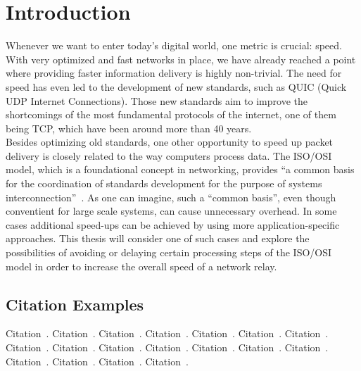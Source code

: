 
\chapter{Introduction}\label{chapter:introduction}

Whenever we want to enter today's digital world, one metric is crucial: speed.
With very optimized and fast networks in place, we have already reached a point where providing faster information
delivery is highly non-trivial.
The need for speed has even led to the development of new standards, such as QUIC (Quick UDP Internet Connections). 
Those new standards aim to improve the shortcomings of the most fundamental protocols of the internet, one of them
being TCP, which have been around more than 40 years. 
\\
Besides optimizing old standards, one other opportunity to speed up packet delivery is closely related to the way 
computers process data.
The ISO/OSI model, which is a foundational concept in networking, provides ``a common basis for the coordination 
of standards development for the purpose of systems interconnection''~\parencite{iso-osi-standard}.
As one can imagine, such a ``common basis'', even though conventient for large scale systems, can cause unnecessary
overhead.
In some cases additional speed-ups can be achieved by using more application-specific approaches.
This thesis will consider one of such cases and explore the possibilities of avoiding or delaying certain processing
steps of the ISO/OSI model in order to increase the overall speed of a network relay.







\section{Citation Examples}
Citation~\parencite{rfc-9000}.
Citation~\parencite{iso-osi-standard}.
Citation~\parencite{draft-moqtransport}.
Citation~\parencite{article-quic-usage}.
Citation~\parencite{internet-quic-usage}.
Citation~\parencite{facebook-quic-usage}.
Citation~\parencite{google-quic-usage}.
Citation~\parencite{quic-nic-offload}.
Citation~\parencite{quic-explained}.
Citation~\parencite{equic-gateway}.
Citation~\parencite{media-streaming-prio-drop}.
Citation~\parencite{quic-nic-offload-patent}.
Citation~\parencite{kernel-bypass-msc-thesis}.
Citation~\parencite{quic-go-repo}.
Citation~\parencite{quic-go-prio-packs-repo}.
Citation~\parencite{adaptive-moq-repo}.
Citation~\parencite{priority-moqtransport-repo}.
Citation~\parencite{fast-relays-thesis-repo}.